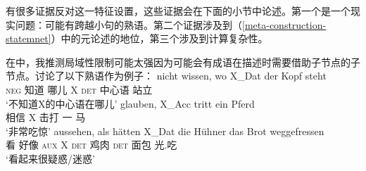 有很多证据反对这一特征设置，这些证据会在下面的小节中论述。第一个是一个现实问题：可能有跨越小句的熟语。第二个证据涉及到（\ref{meta-construction-statemnet}）中的元论述的地位，第三个涉及到计算复杂性。


在中，我推测局域性限制可能太强因为可能会有成语在描述时需要借助子节点的子节点。讨论了以下熟语作为例子：
\eal
\label{ex-idiom-non-nominative-external}
\ex 
\gll nicht wissen, wo    X\_Dat der Kopf steht\\
     \textsc{neg}   知道   哪儿 X   \textsc{det} 中心语 站立\\
\glt `不知道X的中心语在哪儿'
\ex\label{mich-tritt-ein-Pferd}
\gll glauben, X\_Acc tritt ein Pferd\\
     相信  X     击打 一 马\\
\glt `非常吃惊'
\ex 
\gll aussehen, als hätten X\_Dat die Hühner das Brot weggefressen\\
	 看 好像 \textsc{aux} X   \textsc{det} 鸡肉  \textsc{det} 面包 光.吃\\
\glt `看起来很疑惑/迷惑'
\ex
\label{ex-look-as-if-butter}


